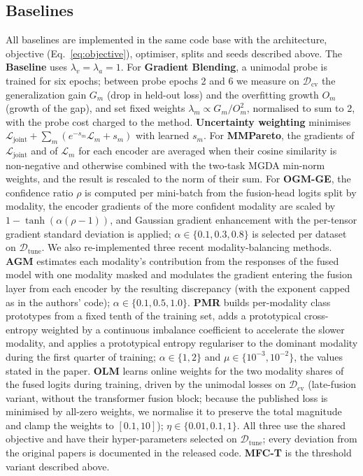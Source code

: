 \documentclass[fleqn,10pt]{wlscirep}
\begin{document}
\subsection*{Baselines}
All baselines are implemented in the same code base with the architecture, objective (Eq.~\ref{eq:objective}), optimiser, splits and seeds described above. The \textbf{Baseline} uses $\lambda_v{=}\lambda_a{=}1$. For \textbf{Gradient Blending}\cite{wang2020makes}, a unimodal probe is trained for six epochs; between probe epochs 2 and 6 we measure on $\mathcal{D}_{\mathrm{cv}}$ the generalization gain $G_m$ (drop in held-out loss) and the overfitting growth $O_m$ (growth of the gap), and set fixed weights $\lambda_m\propto G_m/O_m^2$, normalised to sum to 2, with the probe cost charged to the method. \textbf{Uncertainty weighting}\cite{kendall2018multi} minimises $\mathcal{L}_{\mathrm{joint}}+\sum_m(e^{-s_m}\mathcal{L}_m+s_m)$ with learned $s_m$. For \textbf{MMPareto}\cite{wei2024mmpareto}, the gradients of $\mathcal{L}_{\mathrm{joint}}$ and of $\mathcal{L}_m$ for each encoder are averaged when their cosine similarity is non-negative and otherwise combined with the two-task MGDA min-norm weights, and the result is rescaled to the norm of their sum. For \textbf{OGM-GE}\cite{peng2022balanced}, the confidence ratio $\rho$ is computed per mini-batch from the fusion-head logits split by modality, the encoder gradients of the more confident modality are scaled by $1-\tanh(\alpha(\rho-1))$, and Gaussian gradient enhancement with the per-tensor gradient standard deviation is applied; $\alpha\in\{0.1,0.3,0.8\}$ is selected per dataset on $\mathcal{D}_{\mathrm{tune}}$. We also re-implemented three recent modality-balancing methods. \textbf{AGM}\cite{li2023boosting} estimates each modality's contribution from the responses of the fused model with one modality masked and modulates the gradient entering the fusion layer from each encoder by the resulting discrepancy (with the exponent capped as in the authors' code); $\alpha\in\{0.1,0.5,1.0\}$. \textbf{PMR}\cite{fan2023pmr} builds per-modality class prototypes from a fixed tenth of the training set, adds a prototypical cross-entropy weighted by a continuous imbalance coefficient to accelerate the slower modality, and applies a prototypical entropy regulariser to the dominant modality during the first quarter of training; $\alpha\in\{1,2\}$ and $\mu\in\{10^{-3},10^{-2}\}$, the values stated in the paper. \textbf{OLM}\cite{zong2024balancing} learns online weights for the two modality shares of the fused logits during training, driven by the unimodal losses on $\mathcal{D}_{\mathrm{cv}}$ (late-fusion variant, without the transformer fusion block; because the published loss is minimised by all-zero weights, we normalise it to preserve the total magnitude and clamp the weights to $[0.1,10]$); $\eta\in\{0.01,0.1,1\}$. All three use the shared objective and have their hyper-parameters selected on $\mathcal{D}_{\mathrm{tune}}$; every deviation from the original papers is documented in the released code. \textbf{MFC-T} is the threshold variant described above.
\end{document}
